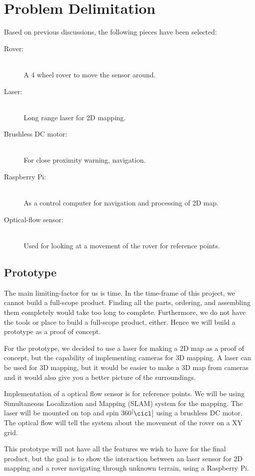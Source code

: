 \section{Problem Delimitation}
Based on previous discussions, the following pieces have been selected:

\begin{description}
  \item[Rover:] \hfill \\
  A 4 wheel rover to move the sensor around.
  \item[Laser:] \hfill \\
  Long range laser for 2D mapping.
  \item[Brushless DC motor:} \hfill \\
  Used to spin the laser a full circle.
  \item[Ultra-sonic sensor:] \hfill \\
  For close proximity warning, navigation.
  \item[Raspberry Pi:] \hfill \\
  As a control computer for navigation and processing of 2D map.
  \item[Optical-flow sensor:] \hfill \\
  Used for looking at a movement of the rover for reference points.
\end{description}

\subsection{Prototype}
The main limiting-factor for us is time. In the time-frame of this project, we cannot build a full-scope product. Finding all the parts, ordering, and assembling them completely would take too long to complete. Furthermore, we do not have the tools or place to build a full-scope product, either. Hence we will build a prototype as a proof of concept.

For the prototype, we decided to use a laser for making a 2D map as a proof of concept, but the capability of implementing cameras for 3D mapping. A laser can be used for 3D mapping, but it would be easier to make a 3D map from cameras and it would also give you a better picture of the surroundings.

Implementation of a optical flow sensor is for reference points. We will be using Simultaneous Localization and Mapping (SLAM) system for the mapping. The laser will be mounted on top and spin 360$^[\cicl]$ using a brushless DC motor. The optical flow will tell the system about the movement of the rover on a XY grid. 

This prototype will not have all the features we wish to have for the final product, but the goal is to show the interaction between an laser sensor for 2D mapping and a rover navigating through unknown terrain, using a Raspberry Pi.

